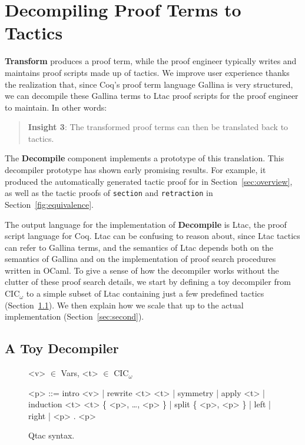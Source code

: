 \section{Decompiling Proof Terms to Tactics}
\label{sec:decompiler}

\textbf{Transform} produces a proof term,
while the proof engineer typically writes and maintains proof scripts made up of tactics.
We improve user experience thanks the realization that, since Coq's proof term language Gallina is very structured,
we can decompile these Gallina terms to Ltac proof scripts for the proof engineer to maintain. In other words:

\begin{quote}
\textbf{Insight 3}: The transformed proof terms can then be translated back to tactics.
\end{quote}

The \textbf{Decompile} component implements a prototype of this translation.
This decompiler prototype has shown early promising results.
For example, it produced the automatically generated tactic proof for  
in Section~\ref{sec:overview}, as well as the tactic proofs of \lstinline{section}
and \lstinline{retraction} in Section~\ref{fig:equivalence}.

The output language for the implementation of \textbf{Decompile} is Ltac, the proof script language for Coq.
Ltac can be confusing to reason about, since Ltac tactics can refer to Gallina terms, and the semantics of Ltac depends both on the
semantics of Gallina and on the implementation of proof search procedures written in OCaml.
To give a sense of how the decompiler works without the clutter of these proof search details, we start by defining a toy
decompiler from CIC$_{\omega}$ to a simple subset of Ltac containing just a few predefined tactics (Section~\ref{sec:first}).
We then explain how we scale that up to the actual implementation (Section~\ref{sec:second}).

\subsection{A Toy Decompiler}
\label{sec:first}

\begin{figure}
\small
\begin{grammar}
<v> $\in$ Vars, <t> $\in$ CIC$_{\omega}$

<p> ::= intro <v> |  rewrite <t> <t> | symmetry | apply <t> | induction <t> <t> \{ <p>, \ldots, <p> \} | split \{ <p>, <p> \} | left | right | <p> . <p>
\end{grammar}
\caption{Qtac syntax.}
\label{fig:ltacsyntax1}
\end{figure}

